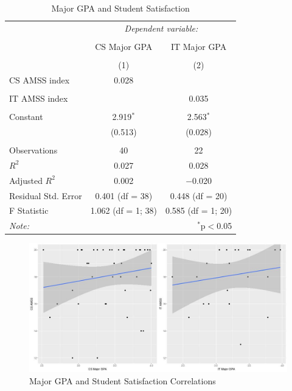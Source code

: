 \begin{table}[!htbp] \centering
  \caption{Major GPA and Student Satisfaction}
  \label{tab:satisfaction}
  \begin{tabular}{@{\extracolsep{5pt}}lcc}
    \toprule
     & \multicolumn{2}{c}{\textit{Dependent variable:}} \\
    \cline{2-3}
    \\[-1.8ex] & CS Major GPA & IT Major GPA \\
    \\[-1.8ex] & (1) & (2)\\
    \midrule
     CS AMSS index & 0.028 &  \\
      & & \\
     IT AMSS index &  & 0.035 \\
      & & \\
     Constant & 2.919$^{*}$ & 2.563$^{*}$ \\
      & (0.513) & (0.028) \\
      & & \\
    \midrule
    Observations & 40 & 22 \\
    $R^{2}$ & 0.027 & 0.028 \\
    Adjusted $R^{2}$ & 0.002 & $-$0.020 \\
    Residual Std. Error & 0.401 (df = 38) & 0.448 (df = 20) \\
    F Statistic & 1.062 (df = 1; 38) & 0.585 (df = 1; 20) \\
    \bottomrule
    \textit{Note:}  & \multicolumn{2}{r}{$^{*}$p$<$0.05} \\
  \end{tabular}
\end{table}

\begin{figure}[!hbtp]
  \centering
  \includegraphics[width=1.05\textwidth]{figures/chapter4/major_gpa_amss_plots.jpg}
  \caption{Major GPA and Student Satisfaction Correlations}
  \label{fig:major_gpa_amss_plots}
\end{figure}

